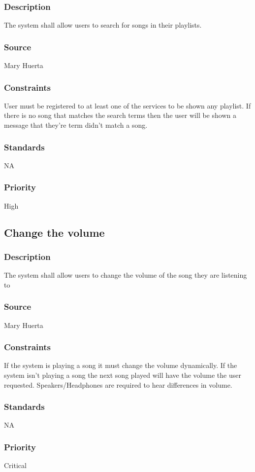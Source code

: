 \subsubsection{Description}
The system shall allow users to search for songs in their playlists. 
\subsubsection{Source}
Mary Huerta
\subsubsection{Constraints}
User must be registered to at least one of the services to be shown any playlist. If there is no song that matches the search terms then the user will be shown a message that they're term didn't match a song.
\subsubsection{Standards}
NA
\subsubsection{Priority}
High



\subsection{Change the volume}
\subsubsection{Description}
The system shall allow users to change the volume of the song they are listening to
\subsubsection{Source}
Mary Huerta
\subsubsection{Constraints}
If the system is playing a song it must change the volume dynamically. If the system isn't playing a song the next song played will have the volume the user requested. Speakers/Headphones are required to hear differences in volume.
\subsubsection{Standards}
NA
\subsubsection{Priority}
Critical



